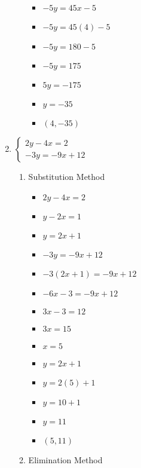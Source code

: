 \begin{enumerate}
\begin{enumerate}
\begin{itemize}
    \item $-5y=45x-5$
    \item $-5y=45(4)-5$
    \item $-5y=180-5$
    \item $-5y=175$
    \item $5y=-175$
    \item $y=-35$
    \item $(4,-35)$
    \end{itemize}
  \end{enumerate}
\item $\left\{ \begin{array}{l}
      2y-4x=2 \\
      -3y=-9x+12 \end{array} \right.$
  \begin{enumerate}
  \item Substitution Method
    \begin{itemize}
    \item $2y-4x=2$
    \item $y-2x=1$
    \item $y=2x+1$
    \item $-3y=-9x+12$
    \item $-3(2x+1)=-9x+12$
    \item $-6x-3=-9x+12$
    \item $3x-3=12$
    \item $3x=15$
    \item $x=5$
    \item $y=2x+1$
    \item $y=2(5)+1$
    \item $y=10+1$
    \item $y=11$
    \item $(5,11)$
    \end{itemize}
  \item Elimination Method
\end{enumerate}
\end{enumerate}
